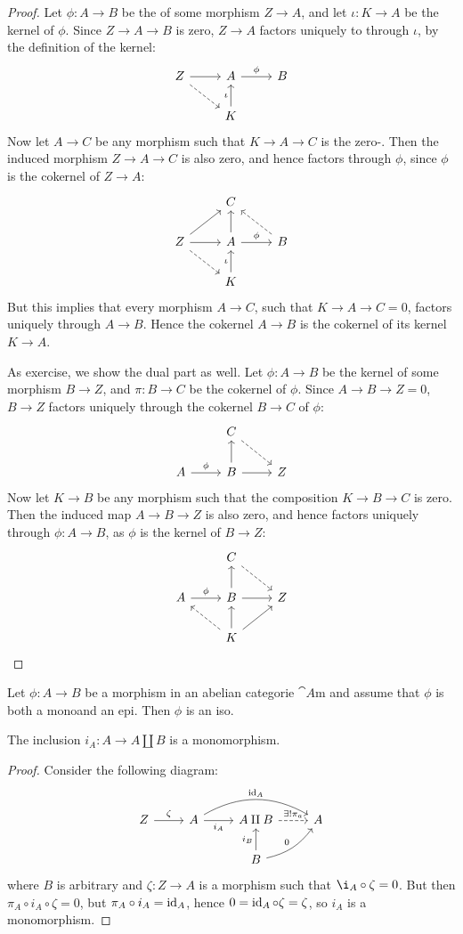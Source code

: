 \documentclass[11pt,twoside]{memoir}
\begin{document}
\begin{proof}
	Let $\phi:A\to B$ be the \tcker of some morphism $Z\to A$, and let $\iota: K\to A$ be the kernel of $\phi$. Since $Z\to A \to B$ is zero, $Z\to A$ factors uniquely to through $\iota$, by the definition of the kernel:
	\[
	\begin{tikzcd}
		Z\ar{r}\ar[dashed]{dr} & A \ar{r}{\phi} &B\\
		&K \ar{u}{\iota}&
	\end{tikzcd}
	\]
	Now let $A \to C$ be any morphism such that $K\to A\to C$ is the zero-\morph. Then the induced morphism $Z\to A \to C$ is also zero, and hence factors through $\phi$, since $\phi$ is the cokernel of $Z\to A$:
	\[
		\begin{tikzcd}
		& C&\\
		Z\ar{r}\ar[dashed]{dr} \ar{ur} & A\ar{u} \ar{r}{\phi} &B\ar[dashed]{ul}\\
		&K \ar{u}{\iota}&
		\end{tikzcd}
	\]
	But this implies that every morphism $A\to C$, such that $K\to A\to C = 0$, factors uniquely through $A\to B$. Hence the cokernel $A\to B$ is the cokernel of its kernel $K\to A$.\par
	As exercise, we show the dual part as well. Let $\phi: A\to B$ be the kernel of some morphism $B\to Z$, and $\pi: B \to C$ be the cokernel of $\phi$. Since $A\to B \to Z = 0$, $B \to Z$ factors uniquely through the cokernel $B\to C$ of $\phi$:
	\[
	\begin{tikzcd}
	&C\ar[dashed]{dr}&\\
	A\ar{r}{\phi}&B \ar{u}\ar{r}& Z
	\end{tikzcd}
	\]
	Now let $K \to B$ be any morphism such that the composition $K\to B \to C$ is zero. Then the induced map $A\to B\to Z$ is also zero, and hence factors uniquely through $\phi:A\to B$, as $\phi$ is the kernel of $B\to Z$:
		\[
		\begin{tikzcd}
		&C\ar[dashed]{dr}&\\
		A\ar{r}{\phi}&B \ar{u}\ar{r}& Z\\
		& K \ar{u}\ar[dashed]{ul}\ar{ur}&
		\end{tikzcd}
		\]
\end{proof}
\begin{lem}
	Let $\phi:A\to B$ be a morphism in an abelian categorie $\cat{A}$m and assume that $\phi$ is both a mono\morph and an epi\morph. Then $\phi$ is an iso\morph.
\end{lem}
\begin{lem}
	The inclusion $i_A:A\to A \amalg B$ is a monomorphism.
\end{lem}
\begin{proof}
	Consider the following diagram:
	\[
	\begin{tikzcd}
	Z \ar{r}{\zeta} & A\ar[bend left=30]{rr}{\id_A} \ar[swap]{r}{i_A}  & A \amalg B \ar[dashed]{r}{\exists!\pi_a} & A\\
	&&B\ar{u}{i_B} \ar[bend left = -20]{ur}{0} &
	\end{tikzcd}
	\]
	where $B$ is arbitrary and $\zeta:Z\to A$ is a morphism such that $\i_A\circ \zeta=0$. But then $\pi_A\circ i_A \circ \zeta = 0$, but $\pi_A\circ i_A = \operatorname{id}_A$, hence $0=\operatorname{id}_A\circ\zeta=\zeta$, so $i_A$ is a monomorphism.
\end{proof}
\end{document}
